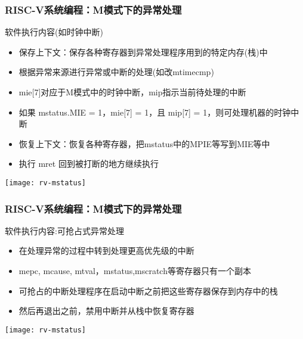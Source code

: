 \begin{frame}
    \frametitle{RISC-V系统编程：M模式下的异常处理}
    软件执行内容(如时钟中断)
    \begin{itemize}
        \item 保存上下文：保存各种寄存器到异常处理程序用到的特定内存(栈)中
        \item 根据异常来源进行异常或中断的处理(如改mtimecmp)
        \item mie[7]对应于M模式中的时钟中断，mip指示当前待处理的中断
        \item 如果 mstatus.MIE = 1，mie[7] = 1，且 mip[7] = 1，则可处理机器的时钟中断
        \item 恢复上下文：恢复各种寄存器，把mstatus中的MPIE等写到MIE等中
        \item 执行 mret 回到被打断的地方继续执行
        
    \end{itemize}
    
    \centering
    \texttt{[image: rv-mstatus]}
    
\end{frame}


\begin{frame}
    \frametitle{RISC-V系统编程：M模式下的异常处理}
    软件执行内容:可抢占式异常处理
    \begin{itemize}
        \item 在处理异常的过程中转到处理更高优先级的中断
        \item mepc, mcause, mtval，mstatus,mscratch等寄存器只有一个副本
        \item 可抢占的中断处理程序在启动中断之前把这些寄存器保存到内存中的栈
        \item 然后再退出之前，禁用中断并从栈中恢复寄存器
        
    \end{itemize}
    
    \centering
    \texttt{[image: rv-mstatus]}
    
\end{frame}


